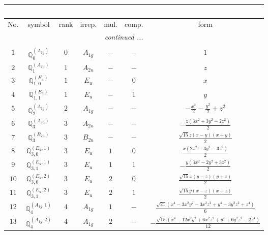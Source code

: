 \documentclass[fleqn,10pt,landscape]{article}
\begin{document}
\begin{itemize}
\begin{center}
\begin{longtable}{ccccccc}
\multicolumn{6}{l}{\tablename\ \thetable{}} \\
 \hline \hline
No. & symbol & rank & irrep. & mul. & comp. & form \\ \hline \endhead

 \hline \hline
\multicolumn{6}{r}{\footnotesize\it continued ...} \\ \endfoot

 \hline \hline
\multicolumn{6}{r}{} \\ \endlastfoot

$ 1 $ & $ \mathbb{Q}_{0}^{(A_{1g})} $ & $ 0 $ & $ A_{1g} $ & $ - $ & $ - $ & $ 1 $ \\ \hline
$ 2 $ & $ \mathbb{Q}_{1}^{(A_{2u})} $ & $ 1 $ & $ A_{2u} $ & $ - $ & $ - $ & $ z $ \\
$ 3 $ & $ \mathbb{Q}_{1,0}^{(E_{u})} $ & $ 1 $ & $ E_{u} $ & $ - $ & $ 0 $ & $ x $ \\
$ 4 $ & $ \mathbb{Q}_{1,1}^{(E_{u})} $ & $ 1 $ & $ E_{u} $ & $ - $ & $ 1 $ & $ y $ \\ \hline
$ 5 $ & $ \mathbb{Q}_{2}^{(A_{1g})} $ & $ 2 $ & $ A_{1g} $ & $ - $ & $ - $ & $ - \frac{x^{2}}{2} - \frac{y^{2}}{2} + z^{2} $ \\ \hline
$ 6 $ & $ \mathbb{Q}_{3}^{(A_{2u})} $ & $ 3 $ & $ A_{2u} $ & $ - $ & $ - $ & $ - \frac{z \left(3 x^{2} + 3 y^{2} - 2 z^{2}\right)}{2} $ \\
$ 7 $ & $ \mathbb{Q}_{3}^{(B_{2u})} $ & $ 3 $ & $ B_{2u} $ & $ - $ & $ - $ & $ \frac{\sqrt{15} z \left(x - y\right) \left(x + y\right)}{2} $ \\
$ 8 $ & $ \mathbb{Q}_{3,0}^{(E_{u},1)} $ & $ 3 $ & $ E_{u} $ & $ 1 $ & $ 0 $ & $ \frac{x \left(2 x^{2} - 3 y^{2} - 3 z^{2}\right)}{2} $ \\
$ 9 $ & $ \mathbb{Q}_{3,1}^{(E_{u},1)} $ & $ 3 $ & $ E_{u} $ & $ 1 $ & $ 1 $ & $ - \frac{y \left(3 x^{2} - 2 y^{2} + 3 z^{2}\right)}{2} $ \\
$ 10 $ & $ \mathbb{Q}_{3,0}^{(E_{u},2)} $ & $ 3 $ & $ E_{u} $ & $ 2 $ & $ 0 $ & $ \frac{\sqrt{15} x \left(y - z\right) \left(y + z\right)}{2} $ \\
$ 11 $ & $ \mathbb{Q}_{3,1}^{(E_{u},2)} $ & $ 3 $ & $ E_{u} $ & $ 2 $ & $ 1 $ & $ \frac{\sqrt{15} y \left(x - z\right) \left(x + z\right)}{2} $ \\ \hline
$ 12 $ & $ \mathbb{Q}_{4}^{(A_{1g},1)} $ & $ 4 $ & $ A_{1g} $ & $ 1 $ & $ - $ & $ \frac{\sqrt{21} \left(x^{4} - 3 x^{2} y^{2} - 3 x^{2} z^{2} + y^{4} - 3 y^{2} z^{2} + z^{4}\right)}{6} $ \\
$ 13 $ & $ \mathbb{Q}_{4}^{(A_{1g},2)} $ & $ 4 $ & $ A_{1g} $ & $ 2 $ & $ - $ & $ - \frac{\sqrt{15} \left(x^{4} - 12 x^{2} y^{2} + 6 x^{2} z^{2} + y^{4} + 6 y^{2} z^{2} - 2 z^{4}\right)}{12} $ \\ \hline

\end{longtable}
\end{center}
\end{itemize}
\end{document}
